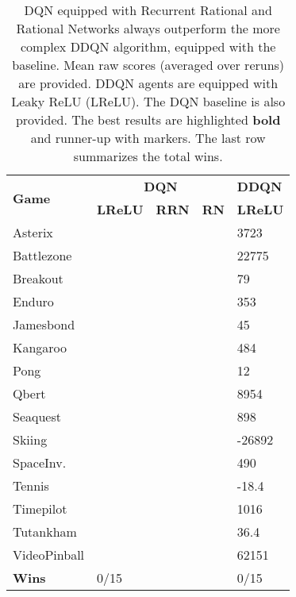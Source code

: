 \documentclass{article}
\begin{document}
\begin{table}[t]
\centering
{\def\arraystretch{1.15}
\begin{tabular}{|l|l|l|l|l|}
\hline
\multicolumn{1}{|l|}{\multirow{2}{*}{\textbf{Game}}} &  \multicolumn{3}{c|}{ \textbf{DQN} }                        & \textbf{DDQN}  \\ \cline{2-5} 
\multicolumn{1}{|c|}{} & \textbf{LReLU}   & \textbf{RRN}   & \textbf{RN}   & \textbf{LReLU} \\ \hline 
Asterix       &          &     &         & 3723     \\ \hline
Battlezone    &         &       &       & 22775    \\ \hline
Breakout      &          &         &         & 79       \\ \hline
Enduro        &          &       &          & 353      \\ \hline
Jamesbond     &           &        &        & 45       \\ \hline
Kangaroo      &          &        &        & 484      \\ \hline
Pong          &           &       &       & 12       \\ \hline
Qbert         &         &     &         & 8954     \\ \hline
Seaquest      &          &        &        & 898      \\ \hline
Skiing        &       &    &        & -26892   \\ \hline
SpaceInv.     &          &        &         & 490      \\ \hline
Tennis        &        &        &        & -18.4    \\ \hline
Timepilot     &         &     &         & 1016     \\ \hline
Tutankham     &          &         &         & 36.4     \\ \hline
VideoPinball  &        &     &        & 62151    \\ \hline \hline
\textbf{ Wins}& 0/15  &           &           & 0/15         \\ \hline
\end{tabular}
}
\caption{DQN equipped with Recurrent Rational and Rational Networks always outperform the more complex DDQN algorithm, equipped with the baseline. Mean raw scores (averaged over  reruns) are provided. DDQN agents are equipped with Leaky ReLU (LReLU). The DQN baseline is also provided. The best results are highlighted \textbf{bold} and runner-up with  markers. The last row summarizes the total wins. \label{tab:ddqn_comp_scores}}
\end{table}
\end{document}
